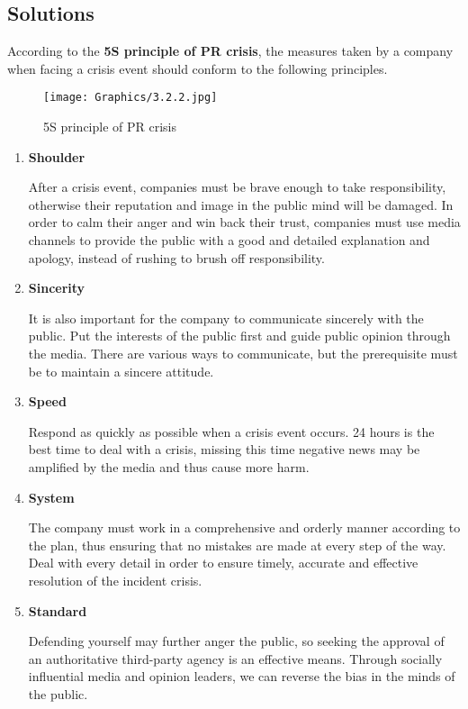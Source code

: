 \documentclass[a4paper, 12pt]{report}
\begin{document}
\subsection{Solutions}
According to the \textbf{5S principle of PR crisis}, the measures taken by a company when facing a crisis event should conform to the following principles.
 \begin{figure}[ht]
 			\begin{center}
				\texttt{[image: Graphics/3.2.2.jpg]}
			\end{center}
       		\caption{\label{3.2.2}5S principle of PR crisis}
 \end{figure}
\begin{enumerate}
    \item \textbf{Shoulder}\par After a crisis event, companies must be brave enough to take responsibility, otherwise their reputation and image in the public mind will be damaged. In order to calm their anger and win back their trust, companies must use media channels to provide the public with a good and detailed explanation and apology, instead of rushing to brush off responsibility.
    \item \textbf{Sincerity}\par It is also important for the company to communicate sincerely with the public. Put the interests of the public first and guide public opinion through the media. There are various ways to communicate, but the prerequisite must be to maintain a sincere attitude.
    \item \textbf{Speed}\par Respond as quickly as possible when a crisis event occurs. 24 hours is the best time to deal with a crisis, missing this time negative news may be amplified by the media and thus cause more harm.
    \item \textbf{System}\par The company must work in a comprehensive and orderly manner according to the plan, thus ensuring that no mistakes are made at every step of the way. Deal with every detail in order to ensure timely, accurate and effective resolution of the incident crisis.
    \item \textbf{Standard}\par Defending yourself may further anger the public, so seeking the approval of an authoritative third-party agency is an effective means. Through socially influential media and opinion leaders, we can reverse the bias in the minds of the public.

\end{enumerate}\par
\end{document}
